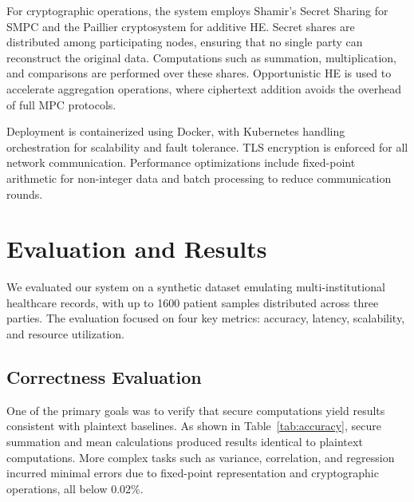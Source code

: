 \documentclass[conference]{IEEEtran}
\begin{document}
For cryptographic operations, the system employs Shamir’s Secret Sharing for SMPC and the Paillier cryptosystem for additive HE. Secret shares are distributed among participating nodes, ensuring that no single party can reconstruct the original data. Computations such as summation, multiplication, and comparisons are performed over these shares. Opportunistic HE is used to accelerate aggregation operations, where ciphertext addition avoids the overhead of full MPC protocols.

Deployment is containerized using Docker, with Kubernetes handling orchestration for scalability and fault tolerance. TLS encryption is enforced for all network communication. Performance optimizations include fixed-point arithmetic for non-integer data and batch processing to reduce communication rounds.
\section{Evaluation and Results}
We evaluated our system on a synthetic dataset emulating multi-institutional healthcare records, with up to 1600 patient samples distributed across three parties. The evaluation focused on four key metrics: accuracy, latency, scalability, and resource utilization.

\subsection{Correctness Evaluation}
One of the primary goals was to verify that secure computations yield results consistent with plaintext baselines. As shown in Table~\ref{tab:accuracy}, secure summation and mean calculations produced results identical to plaintext computations. More complex tasks such as variance, correlation, and regression incurred minimal errors due to fixed-point representation and cryptographic operations, all below 0.02\%.

\begin{table}[t]
\centering
\caption{Accuracy Comparison: Secure vs. Plaintext Computations}
\label{tab:accuracy}
\vspace{0.4em}
\vspace{0.6em}
\end{table}
\end{document}
